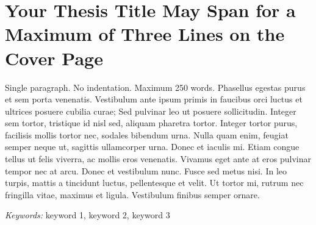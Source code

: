 \documentclass[a4paper,12pt,stu,donotrepeattitle,floatsintext,twoside]{apa7}
\newcommand{\titlet}{Your Thesis Title May Span for a Maximum of Three Lines on the Cover Page}
\begin{document}
\cleardoublepage



\section{\titlet}
\vspace{0.5\baselineskip}   %

{%
\relax
{}\relax
\noindent Single paragraph. No indentation. Maximum 250 words. Phasellus egestas purus et sem porta venenatis. Vestibulum ante ipsum primis in faucibus orci luctus et ultrices posuere cubilia curae; Sed pulvinar leo ut posuere sollicitudin. Integer sem tortor, tristique id nisl sed, aliquam pharetra tortor. Integer tortor purus, facilisis mollis tortor nec, sodales bibendum urna. Nulla quam enim, feugiat semper neque ut, sagittis ullamcorper urna. Donec et iaculis mi. Etiam congue tellus ut felis viverra, ac mollis eros venenatis. Vivamus eget ante at eros pulvinar tempor nec at arcu. Donec et vestibulum nunc. Fusce sed metus nisi. In leo turpis, mattis a tincidunt luctus, pellentesque et velit. Ut tortor mi, rutrum nec fringilla vitae, maximus et ligula. Vestibulum finibus semper ornare.

\textit{Keywords:} keyword 1, keyword 2, keyword 3
\vspace{0.75\baselineskip}
}
\end{document}
